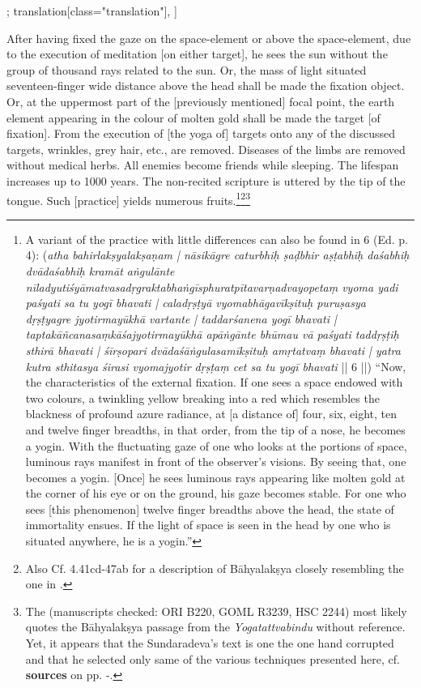 \begin{alignment}[
  texts=edition[class="edition"];
  translation[class="translation"],
  ]
\begin{translation}
\begin{tlate}[p23_02]
After having fixed the gaze on the space-element or above the space-element, due to the execution of meditation [on either target], he sees the sun without the group of thousand rays related to the sun. Or, the mass of light situated seventeen-finger wide distance above the head shall be made the fixation object. Or, at the uppermost part of the [previously mentioned] focal point, the earth element appearing in the colour of molten gold shall be made the target [of fixation]. From the execution of [the yoga of] targets onto any of the discussed targets, wrinkles, grey hair, etc., are removed. Diseases of the limbs are removed without medical herbs. All enemies become friends while sleeping. The lifespan increases up to 1000 years. The non-recited scripture is uttered by the tip of the tongue. Such [practice] yields numerous fruits.\footnote{A variant of the practice with little differences can also be found in  6 (Ed. p. 4): (\textit{atha bahirlakṣyalakṣaṇam | nāsikāgre caturbhiḥ ṣaḍbhir aṣṭabhiḥ daśabhiḥ dvādaśabhiḥ kramāt aṅgulānte nīladyutiśyāmatvasadṛgraktabhaṅgīsphuratpītavarṇadvayopetaṃ vyoma yadi paśyati sa tu yogī bhavati | caladṛṣṭyā vyomabhāgavīkṣituḥ puruṣasya dṛṣṭyagre jyotirmayūkhā vartante | taddarśanena yogī bhavati | taptakāñcanasaṃkāśajyotirmayūkhā apāṅgānte bhūmau vā paśyati taddṛṣṭiḥ sthirā bhavati | śīrṣopari dvādaśāṅgulasamīkṣituḥ amṛtatvaṃ bhavati | yatra kutra sthitasya śirasi vyomajyotir dṛṣṭaṃ cet sa tu yogī bhavati} || 6 ||) ``Now, the characteristics of the external fixation. If one sees a space endowed with two colours, a twinkling yellow breaking into a red which resembles the blackness of profound azure radiance, at [a distance of] four, six, eight, ten and twelve finger breadths, in that order, from the tip of a nose, he becomes a yogin. With the fluctuating gaze of one who looks at the portions of space, luminous rays manifest in front of the observer's visions. By seeing that, one becomes a yogin. [Once] he sees luminous rays appearing like molten gold at the corner of his eye or on the ground, his gaze becomes stable. For one who sees [this phenomenon] twelve finger breadths above the head, the state of immortality ensues. If the light of space is seen in the head by one who is situated anywhere, he is a yogin.''}\footnote{Also Cf.  4.41cd-47ab for a description of Bāhyalakṣya closely resembling the one in .}\footnote{The  (manuscripts checked: ORI B220, GOML R3239, HSC 2244) most likely quotes the Bāhyalakṣya passage from the \textit{Yogatattvabindu} without reference. Yet, it appears that the Sundaradeva's text is one the one hand corrupted and that he selected only same of the various techniques presented here, cf. \textbf{sources} on pp. \pageref{bahya}-\pageref{continuebahya}.}
\end{tlate}
  \end{translation}
\end{alignment}
